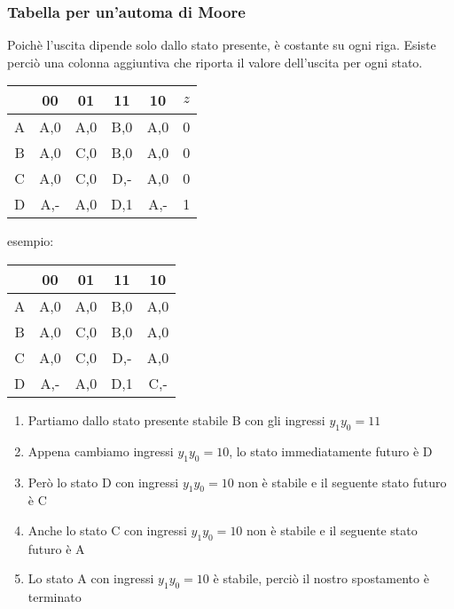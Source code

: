 \documentclass{subfiles}
\begin{document}
\subsubsection{Tabella per un'automa di Moore}

Poichè l'uscita dipende solo dallo stato presente, è costante su ogni riga.
Esiste perciò una colonna aggiuntiva che riporta il valore dell'uscita per ogni stato.

\begin{center}
\begin{tabular}{ |c|c|c|c|c|c| }
\hline
& 00 & 01 & 11 & 10 & $z$ \\
\hline
\hline
A & A,0 & A,0 & B,0 & A,0 & 0 \\
B & A,0 & C,0 & B,0 & A,0 & 0 \\
C & A,0 & C,0 & D,- & A,0 & 0 \\
D & A,- & A,0 & D,1 & A,- & 1 \\
\hline
\end{tabular}
\end{center}

\noindent
esempio:

\begin{center}
\begin{tabular}{ |c|c|c|c|c| }
\hline
& 00 & 01 & 11 & 10 \\
\hline
\hline
A & A,0 & A,0 & B,0 & A,0 \\
B & A,0 & C,0 & B,0 & A,0 \\
C & A,0 & C,0 & D,- & A,0 \\
D & A,- & A,0 & D,1 & C,- \\
\hline
\end{tabular}
\end{center}

\begin{enumerate}
    \item Partiamo dallo stato presente stabile B con gli ingressi $y_1y_0 = 11$
    \item Appena cambiamo ingressi $y_1y_0 = 10$, lo stato immediatamente futuro è D
    \item Però lo stato D con ingressi $y_1y_0 = 10$ non è stabile e il seguente stato futuro è C
    \item Anche lo stato C con ingressi $y_1y_0 = 10$ non è stabile e il seguente stato futuro è A
    \item Lo stato A con ingressi $y_1y_0 = 10$ è stabile, perciò il nostro spostamento è terminato
\end{enumerate}
\end{document}
